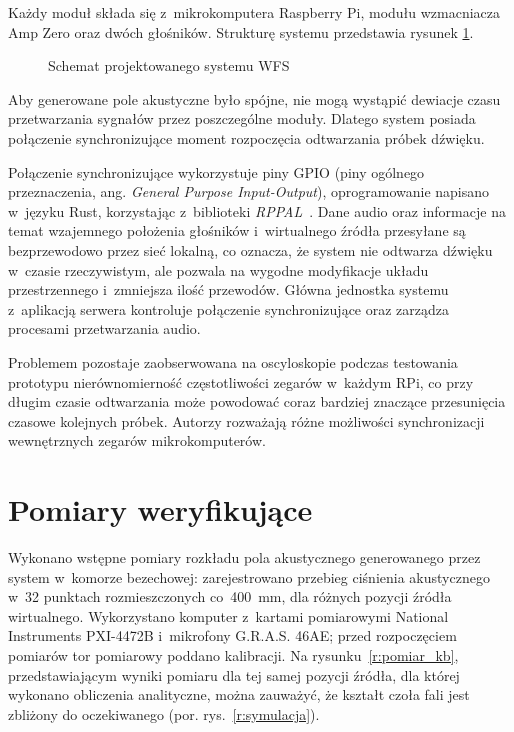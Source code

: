 \documentclass[10pt, a4paper]{article}
\let\Oldsection\section
\renewcommand{\section}{\FloatBarrier\Oldsection}
\begin{document}
Każdy moduł składa się z~mikrokomputera Raspberry Pi, modułu wzmacniacza Amp Zero
oraz dwóch głośników.
Strukturę systemu przedstawia rysunek \ref{fig:schemat}.

\begin{figure}[!tbh]
  \centering
  \caption{Schemat projektowanego systemu WFS}
  \label{fig:schemat}
\end{figure}

Aby generowane pole akustyczne było spójne, nie mogą wystąpić dewiacje czasu
przetwarzania sygnałów przez poszczególne moduły. Dlatego system posiada połączenie
synchronizujące moment rozpoczęcia odtwarzania próbek dźwięku.

Połączenie synchronizujące wykorzystuje piny GPIO (piny ogólnego przeznaczenia, ang.
\textit{General Purpose Input-Output}), oprogramowanie napisano w~języku
Rust, korzystając z~biblioteki
\emph{RPPAL}~\cite{RPPAL}. Dane audio oraz informacje na temat wzajemnego położenia
głośników i~wirtualnego źródła przesyłane są bezprzewodowo przez sieć lokalną, co
oznacza, że system nie odtwarza dźwięku w~czasie rzeczywistym, ale
pozwala na wygodne modyfikacje układu przestrzennego i~zmniejsza ilość
przewodów. Główna jednostka systemu z~aplikacją serwera kontroluje połączenie
synchronizujące oraz zarządza procesami przetwarzania audio.

Problemem pozostaje zaobserwowana na oscyloskopie podczas testowania prototypu nierównomierność częstotliwości zegarów w~każdym RPi,
co przy długim czasie odtwarzania może powodować coraz bardziej znaczące przesunięcia czasowe kolejnych próbek.
Autorzy rozważają różne możliwości synchronizacji wewnętrznych zegarów mikrokomputerów.

\section{Pomiary weryfikujące}

Wykonano wstępne pomiary rozkładu pola akustycznego generowanego przez system
w~komorze bezechowej: zarejestrowano przebieg ciśnienia akustycznego w~32 punktach
rozmieszczonych co~\SI{400}{\milli\metre}, dla różnych pozycji źródła wirtualnego.
Wykorzystano komputer z~kartami pomiarowymi National Instruments PXI-4472B i~mikrofony
G.R.A.S. 46AE; przed rozpoczęciem pomiarów tor pomiarowy poddano kalibracji.
Na rysunku~\ref{r:pomiar_kb}, przedstawiającym wyniki pomiaru dla tej samej pozycji
źródła, dla której wykonano obliczenia analityczne, można zauważyć,
że kształt czoła fali jest zbliżony do oczekiwanego (por. rys.~\ref{r:symulacja}).
\end{document}
